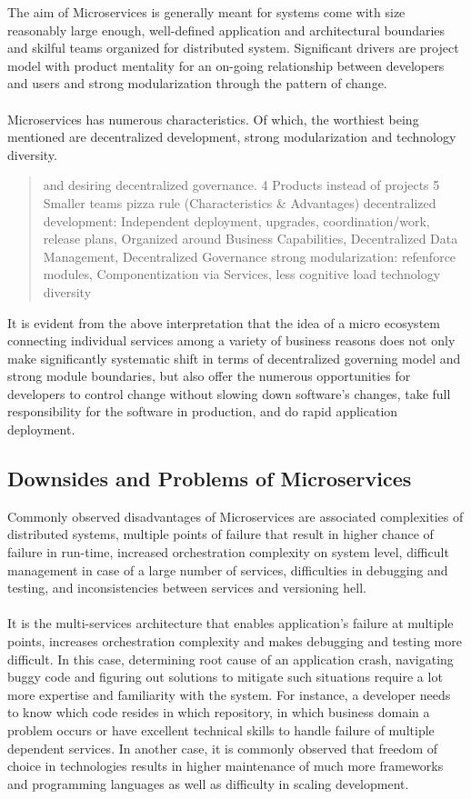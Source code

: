 \documentclass[a4paper]{book}
\begin{document}
The aim of Microservices is generally meant for systems come with size reasonably large enough, well-defined application and architectural boundaries \cite{BoundedContext} and skilful teams organized for distributed system. Significant drivers are project model with product mentality for an on-going relationship between developers and users and strong modularization through the pattern of change. \cite{Lew14}
\\ \\
Microservices has numerous characteristics. Of which, the worthiest being mentioned are decentralized development, strong modularization and technology diversity. \cite{Lew14, MTO} 
\begin{quote}
and desiring decentralized governance. 
4 Products instead of projects
5 Smaller teams pizza rule
(Characteristics & Advantages)
decentralized development: Independent deployment, upgrades, coordination/work, release plans, Organized around Business Capabilities, Decentralized Data Management, Decentralized Governance
strong modularization: refenforce modules, Componentization via Services, less cognitive load
technology diversity
\end{quote}

It is evident from the above interpretation that the idea of a micro ecosystem connecting individual services among a variety of business reasons does not only make significantly systematic shift in terms of decentralized governing model and strong module boundaries, but also offer the numerous opportunities for developers to control change without slowing down software's changes, take full responsibility for the software in production, and do rapid application deployment.

\subsection{Downsides and Problems of Microservices}

Commonly observed disadvantages of Microservices are associated complexities of distributed systems, multiple points of failure that result in higher chance of failure in run-time, increased orchestration complexity on system level, difficult management in case of a large number of services, difficulties in debugging and testing, and inconsistencies between services and versioning hell.
\\ \\
It is the multi-services architecture that enables application’s failure at multiple points, increases orchestration complexity and makes debugging and testing more difficult. In this case, determining root cause of an application crash, navigating buggy code and figuring out solutions to mitigate such situations require a lot more expertise and familiarity with the system. For instance, a developer needs to know which code resides in which repository, in which business domain a problem occurs or have excellent technical skills to handle failure of multiple dependent services. In another case, it is commonly observed that freedom of choice in technologies results in higher maintenance of much more frameworks and programming languages as well as difficulty in scaling development.
\end{document}
